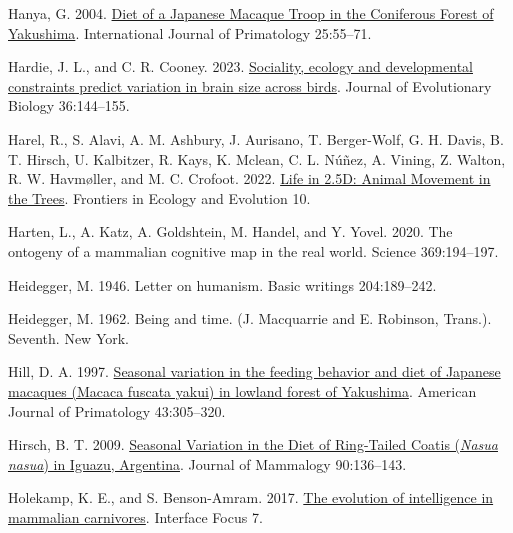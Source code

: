 \documentclass[twoside,12pt,final]{ucthesis-CA2012}
\newenvironment{CSLReferences}%
  {}%
  {\par}
\begin{document}
\begin{ucmainmatter}
\begin{CSLReferences}{1}{0}
\leavevmode{}%
Hanya, G. 2004. \href{https://doi.org/10.1023/B:IJOP.0000014645.78610.32}{Diet of a Japanese Macaque Troop in the Coniferous Forest of Yakushima}. International Journal of Primatology 25:55--71.

\leavevmode{}%
Hardie, J. L., and C. R. Cooney. 2023. \href{https://doi.org/10.1111/jeb.14117}{Sociality, ecology and developmental constraints predict variation in brain size across birds}. Journal of Evolutionary Biology 36:144--155.

\leavevmode{}%
Harel, R., S. Alavi, A. M. Ashbury, J. Aurisano, T. Berger-Wolf, G. H. Davis, B. T. Hirsch, U. Kalbitzer, R. Kays, K. Mclean, C. L. Núñez, A. Vining, Z. Walton, R. W. Havmøller, and M. C. Crofoot. 2022. \href{https://doi.org/10.3389/fevo.2022.801850}{Life in 2.5D: Animal Movement in the Trees}. Frontiers in Ecology and Evolution 10.

\leavevmode{}%
Harten, L., A. Katz, A. Goldshtein, M. Handel, and Y. Yovel. 2020. The ontogeny of a mammalian cognitive map in the real world. Science 369:194--197.

\leavevmode{}%
Heidegger, M. 1946. Letter on humanism. Basic writings 204:189--242.

\leavevmode{}%
Heidegger, M. 1962. Being and time. (J. Macquarrie and E. Robinson, Trans.). Seventh. New York.

\leavevmode{}%
Hill, D. A. 1997. \href{https://doi.org/10.1002/(SICI)1098-2345(1997)43:4\%3C305::AID-AJP2\%3E3.0.CO;2-0}{Seasonal variation in the feeding behavior and diet of Japanese macaques (Macaca fuscata yakui) in lowland forest of Yakushima}. American Journal of Primatology 43:305--320.

\leavevmode{}%
Hirsch, B. T. 2009. \href{https://doi.org/10.1644/08-MAMM-A-050.1}{Seasonal Variation in the Diet of Ring-Tailed Coatis (\emph{Nasua nasua}) in Iguazu, Argentina}. Journal of Mammalogy 90:136--143.

\leavevmode{}%
Holekamp, K. E., and S. Benson-Amram. 2017. \href{https://doi.org/10.1098/rsfs.2016.0108}{The evolution of intelligence in mammalian carnivores}. Interface Focus 7.


\end{CSLReferences}
\end{ucmainmatter}
\end{document}

